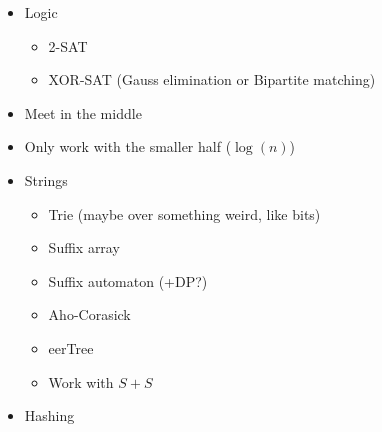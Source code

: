 \documentclass[9pt,a4paper,twocolumn,landscape,oneside]{amsart}
\newenvironment{myitemize}
{ \begin{itemize}[leftmargin=.5cm]
    \setlength{\itemsep}{0pt}
    \setlength{\parskip}{0pt}
    \setlength{\parsep}{0pt}     }
{ \end{itemize}                  }
\begin{document}
\begin{multicols*}{3}
\begin{myitemize}
\begin{itemize}
                        \item Modular arithmetic
                            \begin{itemize}
                                \item Chinese Remainder Theorem
                                \item Linear Congruence
                            \end{itemize}
                        \item Sieve
                        \item System of linear equations
                        \item Values to big to represent?
                            \begin{itemize}
                                \item Compute using the logarithm
                                \item Divide everything by some large value
                            \end{itemize}
                    \end{itemize}
                \item Logic
                    \begin{itemize}
                        \item 2-SAT
                        \item XOR-SAT (Gauss elimination or Bipartite matching)
                    \end{itemize}
                \item Meet in the middle
                \item Only work with the smaller half ($\log(n)$)
                \item Strings
                    \begin{itemize}
                        \item Trie (maybe over something weird, like bits)
                        \item Suffix array
                        \item Suffix automaton (+DP?)
                        \item Aho-Corasick
                        \item eerTree
                        \item Work with $S+S$
                    \end{itemize}
                \item Hashing

\end{myitemize}
\end{multicols*}
\end{document}
